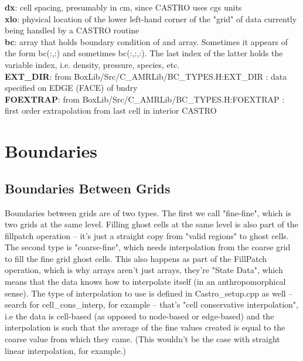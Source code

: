 {\bf dx}: cell spacing, presumably in cm, since CASTRO uses cgs units\\

{\bf xlo}: physical location of the lower left-hand corner of the "grid" of data currently being handled by a CASTRO routine\\

{\bf bc}: array that holds boundary condition of and array. Sometimes it appears of the form bc(:,:) and sometimes bc(:,:,:). The last index of the latter holds the variable index, i.e. density, pressure, species, etc.\\

{\bf EXT\_DIR}: from BoxLib/Src/C_AMRLib/BC\_TYPES.H:EXT\_DIR  : data specified on EDGE (FACE) of bndry\\

{\bf FOEXTRAP}: from BoxLib/Src/C_AMRLib/BC\_TYPES.H:FOEXTRAP  : first order extrapolation from last cell in interior CASTRO 

\section{Boundaries}
\subsection{Boundaries Between Grids}
Boundaries between grids are of two types. The first we call "fine-fine", which is two grids at the same level. 
Filling ghost cells at the same level is also part of the fillpatch operation -- it's just a straight copy from "valid regions" 
to ghost cells. The second type is "coarse-fine", which needs interpolation from the coarse grid to fill the fine grid ghost cells. 
This also happens as part of the FillPatch operation, which is why arrays aren't just arrays, they're "State Data", 
which means that the data knows how to interpolate itself (in an anthropomorphical sense). 
The type of interpolation to use is defined in Castro\_setup.cpp as well -- search for cell\_cons\_interp, for example -- 
that's "cell conservative interpolation", i.e the data is cell-based (as opposed to node-based or edge-based) and the 
interpolation is such that the average of the fine values created is equal to the coarse value from which they came. 
(This wouldn't be the case with straight linear interpolation, for example.) 

